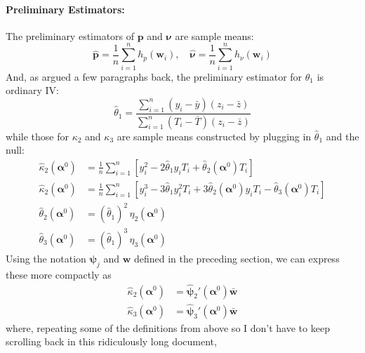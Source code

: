 \documentclass[12pt]{article}
\begin{document}
\paragraph{Preliminary Estimators:} The preliminary estimators of $\mathbf{p}$ and $\boldsymbol{\nu}$ are sample means:
\[
  \widehat{\mathbf{p}} = \frac{1}{n}\sum_{i=1}^n h_p(\mathbf{w}_i), \quad
  \widehat{\boldsymbol{\nu}} = \frac{1}{n}\sum_{i=1}^n h_\nu(\mathbf{w}_i) 
\]
And, as argued a few paragraphs back, the preliminary estimator for $\theta_1$ is ordinary IV: 
\[
  \widehat{\theta}_1 = \frac{\sum_{i=1}^n (y_i - \bar{y})(z_i - \bar{z})}{\sum_{i=1}^n (T_i - \bar{T})(z_i - \bar{z})}
\]
while those for $\kappa_2$ and $\kappa_3$ are sample means constructed by plugging in $\widehat{\theta}_1$ and the null:
\begin{align*}
  \widehat{\kappa}_2(\boldsymbol{\alpha}^0) &= \frac{1}{n} \sum_{i=1}^n \left[y_i^2 - 2\widehat{\theta}_1 y_i T_i + \widehat{\theta}_2(\boldsymbol{\alpha}^0) T_i \right]\\
  \widehat{\kappa}_2(\boldsymbol{\alpha}^0) &= \frac{1}{n} \sum_{i=1}^n 
  \left[y_i^3 - 3\widehat{\theta}_1  y_i^2 T_i +  3\widehat{\theta}_2(\boldsymbol{\alpha}^0) y_iT_i -  \widehat{\theta}_3(\boldsymbol{\alpha}^0)T_i\right]\\
  \widehat{\theta}_2(\boldsymbol{\alpha}^0) &= (\widehat{\theta}_1)^2 \, \eta_2(\boldsymbol{\alpha}^0)\\
  \widehat{\theta}_3(\boldsymbol{\alpha}^0) &= (\widehat{\theta}_1)^3\, \eta_3(\boldsymbol{\alpha}^0)
\end{align*}
Using the notation $\boldsymbol{\psi}_j$ and $\mathbf{w}$ defined in the preceding section, we can express these more compactly as
\begin{align*}
  \widehat{\kappa}_2(\boldsymbol{\alpha}^0) &= \widehat{\boldsymbol{\psi}}_2'(\boldsymbol{\alpha}^0) \bar{\mathbf{w}}\\
  \widehat{\kappa}_3(\boldsymbol{\alpha}^0) &= \widehat{\boldsymbol{\psi}}_3'(\boldsymbol{\alpha}^0) \bar{\mathbf{w}}
\end{align*}
where, repeating some of the definitions from above so I don't have to keep scrolling back in this ridiculously long document, 
\end{document}
